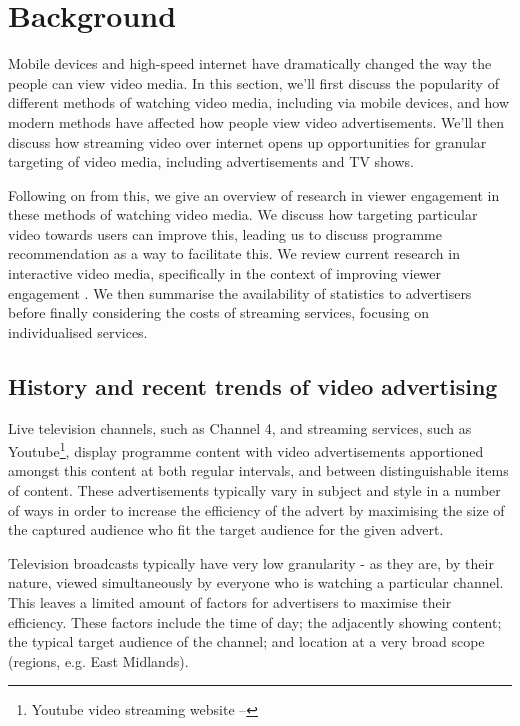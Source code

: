 \section{Background}

Mobile devices and high-speed internet have dramatically changed the way the people can view video media. In this section, we'll first discuss the popularity of different methods of watching video media, including via mobile devices, and how modern methods have affected how people view video advertisements. We'll then discuss how streaming video over internet opens up opportunities for granular targeting of video media, including advertisements and TV shows. 

Following on from this, we give an overview of research in viewer engagement in these methods of watching video media. We discuss how targeting particular video towards users can improve this, leading us to discuss programme recommendation as a way to facilitate this. We review current research in interactive video media, specifically in the context of improving viewer engagement \cite{what_is_engagement}. We then summarise the availability of statistics to advertisers before finally considering the costs of streaming services, focusing on individualised services.

\subsection{History and recent trends of video advertising}

	Live television channels, such as Channel 4, and streaming services, such as Youtube\footnote{Youtube video streaming website -- }, display programme content with video advertisements apportioned amongst this content at both regular intervals, and between distinguishable items of content. These advertisements typically vary in subject and style in a number of ways in order to increase the efficiency of the advert by maximising the size of the captured audience who fit the target audience for the given advert.

	Television broadcasts typically have very low granularity - as they are, by their nature, viewed simultaneously by everyone who is watching a particular channel. This leaves a limited amount of factors for advertisers to maximise their efficiency. These factors include the time of day; the adjacently showing content; the typical target audience of the channel; and location at a very broad scope (regions, e.g. East Midlands).

